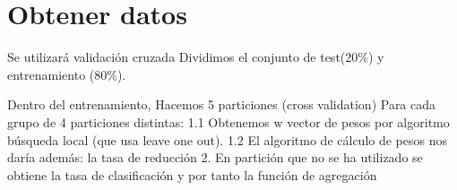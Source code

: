 \section{Obtener datos }  

Se utilizará validación cruzada  
Dividimos el conjunto de test(20\%) y entrenamiento (80\%).

Dentro del entrenamiento, 
Hacemos 5 particiones (cross validation)
Para cada grupo de 4 particiones distintas: 
    1.1 Obtenemos w vector de pesos por algoritmo búsqueda local (que usa leave one out).
    1.2 El algoritmo de cálculo de pesos nos daría además:  la tasa de reducción
    2. En partición que no se ha utilizado se obtiene la tasa de clasificación y por tanto la función de agregación 